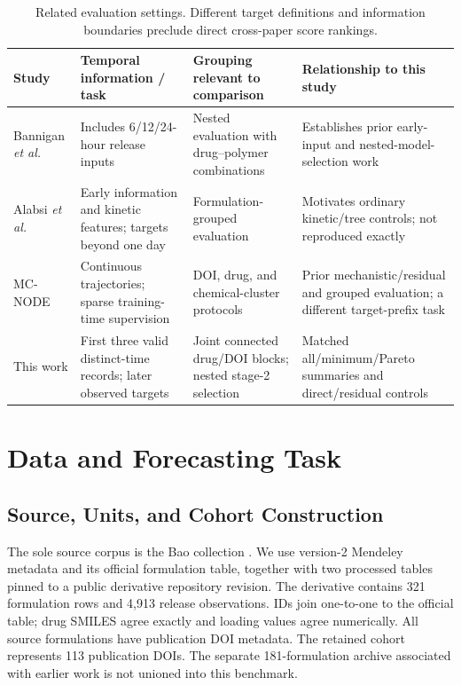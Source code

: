 \documentclass[conference,letterpaper]{IEEEtran}
\begin{document}
\begin{table}[t]
\caption{Related evaluation settings. Different target definitions and information boundaries preclude direct cross-paper score rankings.}
\label{tab:positioning}
\centering\small
\begin{tabularx}{\textwidth}{@{}p{}YYY@{}}\toprule
Study & Temporal information / task & Grouping relevant to comparison & Relationship to this study \\\midrule
Bannigan \emph{et al.} \cite{bannigan2023} & Includes 6/12/24-hour release inputs & Nested evaluation with drug--polymer combinations & Establishes prior early-input and nested-model-selection work \\
Alabsi \emph{et al.} \cite{alabsi2026} & Early information and kinetic features; targets beyond one day & Formulation-grouped evaluation & Motivates ordinary kinetic/tree controls; not reproduced exactly \\
MC-NODE \cite{tang2026} & Continuous trajectories; sparse training-time supervision & DOI, drug, and chemical-cluster protocols & Prior mechanistic/residual and grouped evaluation; a different target-prefix task \\
This work & First three valid distinct-time records; later observed targets & Joint connected drug/DOI blocks; nested stage-2 selection & Matched all/minimum/Pareto summaries and direct/residual controls \\\bottomrule
\end{tabularx}
\end{table}

\section{Data and Forecasting Task}
\subsection{Source, Units, and Cohort Construction}
The sole source corpus is the Bao collection \cite{bao2025,baoData2024}. We use version-2 Mendeley metadata and its official formulation table, together with two processed tables pinned to a public derivative repository revision. The derivative contains 321 formulation rows and 4,913 release observations. IDs join one-to-one to the official table; drug SMILES agree exactly and loading values agree numerically. All source formulations have publication DOI metadata. The retained cohort represents 113 publication DOIs. The separate 181-formulation archive associated with earlier work is not unioned into this benchmark.
\end{document}
